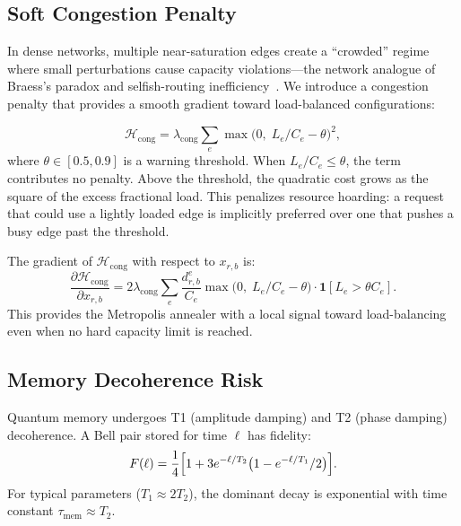 \documentclass[10pt,a4paper]{article}
\newcommand{\calH}{\mathcal{H}}
\begin{document}
\subsection{Soft Congestion Penalty}
\label{sec:congestion}

In dense networks, multiple near-saturation edges create a
``crowded'' regime where small perturbations cause capacity
violations---the network analogue of Braess's paradox and
selfish-routing inefficiency~\cite{braess1968paradoxon,
koutsoupias1999worst,roughgarden2002bad}.  We introduce a congestion
penalty that provides a smooth gradient toward load-balanced
configurations:

\begin{equation}
  \calH_{\text{cong}} = \lambda_{\text{cong}} \sum_e
    \max\!\bigl(0,\; L_e/C_e - \theta\bigr)^2,
\label{eq:congestion}
\end{equation}
where $\theta \in [0.5, 0.9]$ is a warning threshold.  When
$L_e/C_e \leq \theta$, the term contributes no penalty.  Above the
threshold, the quadratic cost grows as the square of the excess
fractional load.  This penalizes resource hoarding: a request that
could use a lightly loaded edge is implicitly preferred over one
that pushes a busy edge past the threshold.

The gradient of $\calH_{\text{cong}}$ with respect to $x_{r,b}$ is:
\begin{equation}
  \frac{\partial \calH_{\text{cong}}}{\partial x_{r,b}}
    = 2\lambda_{\text{cong}} \sum_e
      \frac{d_{r,b}^e}{C_e}
      \max\!\bigl(0,\; L_e/C_e - \theta\bigr)
      \cdot \mathbf{1}[L_e > \theta C_e].
\end{equation}
This provides the Metropolis annealer with a local signal toward
load-balancing even when no hard capacity limit is reached.

\subsection{Memory Decoherence Risk}
\label{sec:memory-risk}

Quantum memory undergoes T1 (amplitude damping) and T2 (phase damping)
decoherence.  A Bell pair stored for time $\ell$ has fidelity:
\begin{equation}
  F(\ell) = \frac{1}{4}\Bigl[1 + 3 e^{-\ell/T_2}
    \bigl(1 - e^{-\ell/T_1}/2\bigr)\Bigr].
\end{equation}
For typical parameters ($T_1 \approx 2T_2$), the dominant decay is
exponential with time constant $\tau_{\text{mem}} \approx T_2$.
\end{document}

